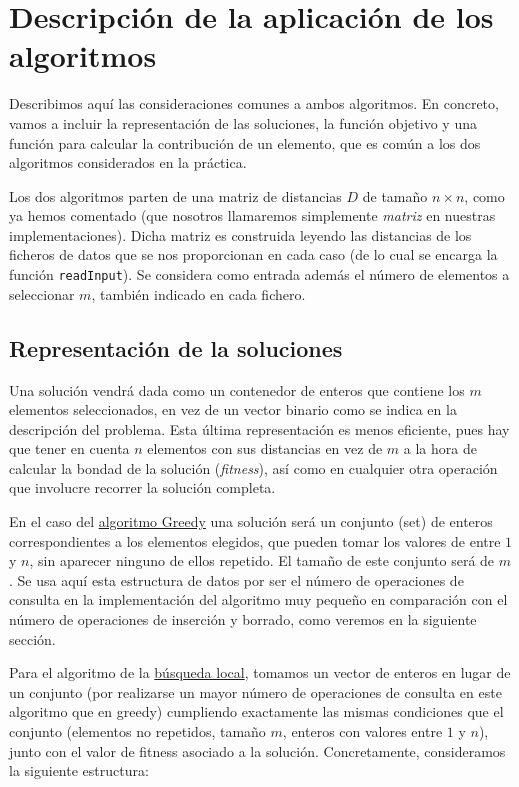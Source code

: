 \documentclass[11pt,a4paper]{article}
\begin{document}
	\section{Descripción de la aplicación de los algoritmos}
	
	Describimos aquí las consideraciones comunes a ambos algoritmos. En concreto, vamos a incluir la representación de las soluciones, la función objetivo y una función para calcular la contribución de un elemento, que es común a los dos algoritmos considerados en la práctica. 
	
	Los dos algoritmos parten de una matriz de distancias $D$ de tamaño $n\times n$, como ya hemos comentado (que nosotros llamaremos simplemente \textit{matriz} en nuestras implementaciones). Dicha matriz es construida leyendo las distancias de los ficheros de datos que se nos proporcionan en cada caso (de lo cual se encarga la función \lstinline|readInput|). Se considera como entrada además el número de elementos a seleccionar $m$, también indicado en cada fichero. 
	
	\subsection{Representación de la soluciones}
	
	Una solución vendrá dada como un contenedor de enteros que contiene los $m$ elementos seleccionados, en vez de un vector binario como se indica en la descripción del problema. Esta última representación es menos eficiente, pues hay que tener en cuenta $n$ elementos con sus distancias en vez de $m$ a la hora de calcular la bondad de la solución (\textit{fitness}), así como en cualquier otra operación que involucre recorrer la solución completa.
	
	En el caso del \underline{algoritmo Greedy} una solución será un conjunto (set) de enteros correspondientes a los elementos elegidos, que pueden tomar los valores de entre $1$ y $n$, sin aparecer ninguno de ellos repetido. El tamaño de este conjunto será de $m$. Se usa aquí esta estructura de datos por ser el número de operaciones de consulta en la implementación del algoritmo muy pequeño en comparación con el número de operaciones de inserción y borrado, como veremos en la siguiente sección. 
	
	 Para el algoritmo de la \underline{búsqueda local}, tomamos un vector de enteros en lugar de un conjunto (por realizarse un mayor número de operaciones de consulta en este algoritmo que en greedy) cumpliendo exactamente las mismas condiciones que el conjunto (elementos no repetidos, tamaño $m$, enteros con valores entre $1$ y $n$),  junto con el valor de fitness asociado a la solución. Concretamente, consideramos la siguiente estructura:
\end{document}
